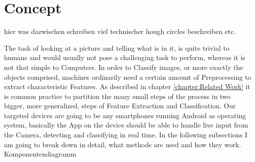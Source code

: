 \chapter{Concept}\label{chapter:Concept}
hier was dazwischen schreiben
viel technischer \newline
hough circles beschreiben etc.\newline\newline

The task of looking at a picture and telling what is in it, is quite trivial to humans and would usually not pose a challenging task to perform, whereas it is not that simple to Computers. In order to Classify images, or more exactly the objects comprised, machines ordinarily need a certain amount of Preprocessing to extract characteristic Features. As described in chapter \ref{chapter:Related Work} it is common practice to partition the many small steps of the process in two bigger, more generalized, steps of Feature Extraction and Classification. Our targeted devices are going to be any smartphones running Android as operating system, basically the App on the device should be able to handle live input from the Camera, detecting and classifying in real time. In the following subsections I am going to break down in detail, what  methods are used and how they work. \newline
Komponentendiagramm\newline


